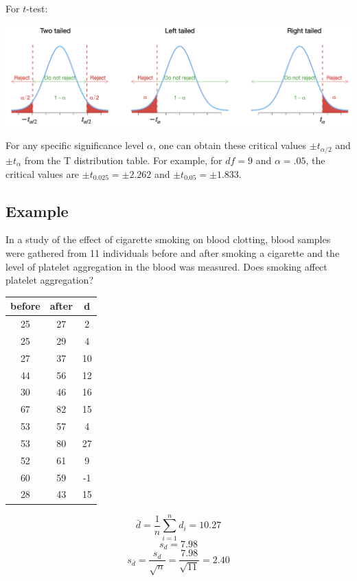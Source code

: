 \documentclass[
]{article}
\begin{document}
For \(t\)-test:

\begin{center}\includegraphics[width=1\linewidth,height=1.3\textheight]{hytestt} \end{center}

For any specific significance level \(\alpha\), one can obtain these
critical values \(\pm t_{\alpha/2}\) and \(\pm t_{\alpha}\) from the T
distribution table. For example, for \(df=9\) and \(\alpha=.05\), the
critical values are \(\pm t_{0.025}=\pm 2.262\) and
\(\pm t_{0.05}=\pm 1.833\).

\hypertarget{example-4}{%
\subsection{Example}\label{example-4}}

In a study of the effect of cigarette smoking on blood clotting, blood
samples were gathered from 11 individuals before and after smoking a
cigarette and the level of platelet aggregation in the blood was
measured. Does smoking affect platelet aggregation?

\begin{longtable}[]{@{}ccc@{}}
\toprule()
before & after & d \\
\midrule()
\endhead
25 & 27 & 2 \\
25 & 29 & 4 \\
27 & 37 & 10 \\
44 & 56 & 12 \\
30 & 46 & 16 \\
67 & 82 & 15 \\
53 & 57 & 4 \\
53 & 80 & 27 \\
52 & 61 & 9 \\
60 & 59 & -1 \\
28 & 43 & 15 \\
\bottomrule()
\end{longtable}

\[\bar{d}=\frac{1}{n}\sum_{i=1}^nd_i=10.27\] \[s_d=7.98\]
\[s_{\bar{d}}=\frac{s_d}{\sqrt{n}}=\frac{7.98}{\sqrt{11}}=2.40\]
\end{document}
